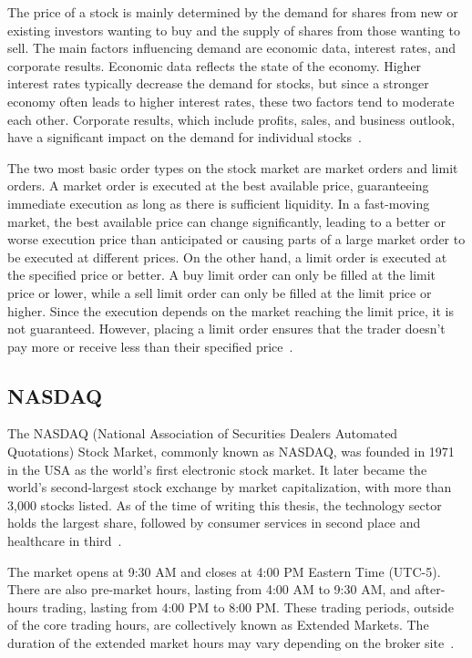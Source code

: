 \documentclass[a4paper,oneside,onecolumn,12pt]{book}
\begin{document}
The price of a stock is mainly determined by the demand for shares from new or existing investors wanting to buy and the supply of shares from those wanting to sell. The main factors influencing demand are economic data, interest rates, and corporate results. Economic data reflects the state of the economy. Higher interest rates typically decrease the demand for stocks, but since a stronger economy often leads to higher interest rates, these two factors tend to moderate each other. Corporate results, which include profits, sales, and business outlook, have a significant impact on the demand for individual stocks~\cite{HDLSandDASM}.

The two most basic order types on the stock market are market orders and limit orders. A market order is executed at the best available price, guaranteeing immediate execution as long as there is sufficient liquidity. In a fast-moving market, the best available price can change significantly, leading to a better or worse execution price than anticipated or causing parts of a large market order to be executed at different prices. On the other hand, a limit order is executed at the specified price or better. A buy limit order can only be filled at the limit price or lower, while a sell limit order can only be filled at the limit price or higher. Since the execution depends on the market reaching the limit price, it is not guaranteed. However, placing a limit order ensures that the trader doesn't pay more or receive less than their specified price~\cite{TBUDWBSS}.

	\subsection{NASDAQ}
	The NASDAQ (National Association of Securities Dealers Automated Quotations) Stock Market, commonly known as NASDAQ, was founded in 1971 in the USA as the world's first electronic stock market. It later became the world's second-largest stock exchange by market capitalization, with more than 3,000 stocks listed. As of the time of writing this thesis, the technology sector holds the largest share, followed by consumer services in second place and healthcare in third~\cite{WNCandWCI}.

	The market opens at 9:30 AM and closes at 4:00 PM Eastern Time (UTC-5). There are also pre-market hours, lasting from 4:00 AM to 9:30 AM, and after-hours trading, lasting from 4:00 PM to 8:00 PM. These trading periods, outside of the core trading hours, are collectively known as Extended Markets. The duration of the extended market hours may vary depending on the broker site~\cite{SMHandTH}.
	
\end{document}
